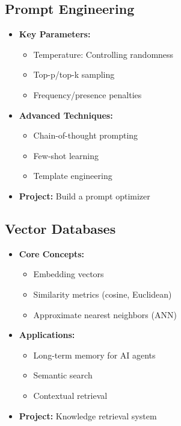 \documentclass{article}
\begin{document}
\subsection{Prompt Engineering}
\begin{itemize}
\item \textbf{Key Parameters:}
    \begin{itemize}
    \item Temperature: Controlling randomness
    \item Top-p/top-k sampling
    \item Frequency/presence penalties
    \end{itemize}
    
\item \textbf{Advanced Techniques:}
    \begin{itemize}
    \item Chain-of-thought prompting
    \item Few-shot learning
    \item Template engineering
    \end{itemize}
    
\item \textbf{Project:} Build a prompt optimizer
\end{itemize}

\subsection{Vector Databases}
\begin{itemize}
\item \textbf{Core Concepts:}
    \begin{itemize}
    \item Embedding vectors
    \item Similarity metrics (cosine, Euclidean)
    \item Approximate nearest neighbors (ANN)
    \end{itemize}
    
\item \textbf{Applications:}
    \begin{itemize}
    \item Long-term memory for AI agents
    \item Semantic search
    \item Contextual retrieval
    \end{itemize}
    
\item \textbf{Project:} Knowledge retrieval system
\end{itemize}
\end{document}
